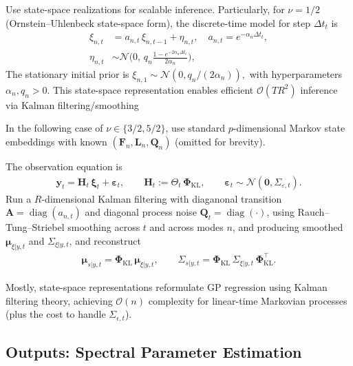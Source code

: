\documentclass[11pt,a4paper]{report}
\theoremstyle{definition}
\providecommand{\ve}[1]{{\boldsymbol{#1}}}
\providecommand{\mat}[1]{{\pmb{#1}}}
\begin{document}
Use state-space realizations for scalable inference. Particularly, for $\nu{=}1/2$ (Ornstein--Uhlenbeck state-space form), the discrete-time model for step $\Delta t_t$ is
\begin{subequations}
\begin{align}
	\xi_{n,t} &= a_{n,t}\,\xi_{n,t-1} + \eta_{n,t}, 
	\quad a_{n,t} = e^{-\alpha_n \Delta t_t}, \\
	\eta_{n,t} &\sim \mathcal{N}\!\Big(0,\, q_n \frac{1-e^{-2\alpha_n \Delta t_t}}{2\alpha_n}\Big),
\end{align}
\end{subequations}
The stationary initial prior is \(\xi_{n,1} {\sim} \mathcal{N}(0, q_n/(2\alpha_n)), \) with hyperparameters $\alpha_n, q_n {>}0$. This state-space representation enables efficient $\mathcal{O}(TR^{2})$ inference via Kalman filtering/smoothing 

In the following case of $\nu{\in}\{3/2,5/2\}$, use standard $p$-dimensional Markov state embeddings with known $(\mat{F}_n, \mat{L}_n, \mat{Q}_n)$ (omitted for brevity).

The observation equation is
\begin{align}
	\ve{y}_t = \mat{H}_t \,\boldsymbol{\xi}_t + \boldsymbol{\varepsilon}_t,
	\qquad \mat{H}_t := \boldsymbol{\varTheta}_t\,\boldsymbol{\Phi}_{\!\mathrm{KL}}, 
	\qquad \boldsymbol{\varepsilon}_t \sim \mathcal{N}(\ve{0}, \boldsymbol{ \varSigma}_{\varepsilon,t}).
\end{align}
Run a $R$-dimensional Kalman filtering with diaganonal transition $\mat{A}{=}\operatorname{diag}(a_{n,t})$ and diagonal process noise $\mat{Q}_t{=}\operatorname{diag}(\cdot)$, using Rauch--Tung--Striebel smoothing across $t$ and across modes $n$, and producing smoothed $\boldsymbol{\mu}_{\xi|y, t}$ and $\boldsymbol{ \varSigma}_{\xi|y, t}$, and reconstruct
\begin{align}
	\boldsymbol{\mu}_{s|y, t} = \mathbf{\Phi}_{\!\mathrm{KL}} \,\boldsymbol{\mu}_{\xi|y, t}, 
	\qquad 
	\boldsymbol{ \varSigma}_{s|y, t} = \mathbf{\Phi}_{\!\mathrm{KL}} \,\boldsymbol{ \varSigma}_{\xi|y, t}\, \mathbf{\Phi}_{\!\mathrm{KL}}^\top.
\end{align}

Mostly, state-space representations reformulate GP regression using Kalman filtering theory, achieving $\mathcal{O}(n)$ complexity for linear-time Markovian processes (plus the cost to handle \(	\boldsymbol{ \varSigma}_{\epsilon, t}\)). 

\subsection*{Outputs: Spectral Parameter Estimation}
\end{document}
